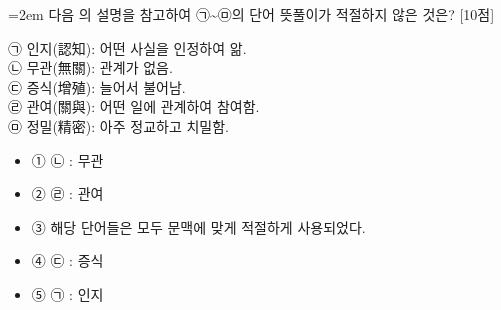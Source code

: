 \documentclass[10pt,a4paper]{article}
\newcommand{\qnum}[1]{%
  \tikz[baseline=(num.base)]{%
    \node[circle, fill=numCircle, text=white, inner sep=0pt,
          minimum size=18pt, font=\small\bfseries] (num) {#1};%
  }%
}
\newcommand{\pts}[1]{%
  \hfill\textcolor{ptsBadge}{[#1점]}%
}
\begin{document}
\vspace{4mm}
\begin{minipage}{\columnwidth}
{\hangindent=2em
\qnum{43}\enspace 다음 의 설명을 참고하여 ㉠\textasciitilde{}㉤의 단어 뜻풀이가 적절하지 않은 것은? \pts{10}
\par}

\vspace{3mm}
\begin{tcolorbox}[bogi]
㉠ 인지(認知): 어떤 사실을 인정하여 앎. \\{}
㉡ 무관(無關): 관계가 없음. \\{}
㉢ 증식(增殖): 늘어서 불어남. \\{}
㉣ 관여(關與): 어떤 일에 관계하여 참여함. \\{}
㉤ 정밀(精密): 아주 정교하고 치밀함.
\end{tcolorbox}
\vspace{3mm}
\begin{itemize}[leftmargin=2.5em, labelsep=0.3em, label={}, itemsep=4pt, parsep=1pt, topsep=0pt]
  \item ① ㉡ : 무관
  \item ② ㉣ : 관여
  \item ③ 해당 단어들은 모두 문맥에 맞게 적절하게 사용되었다.
  \item ④ ㉢ : 증식
  \item ⑤ ㉠ : 인지
\end{itemize}
\end{minipage}
\vspace{4mm}
\end{document}
